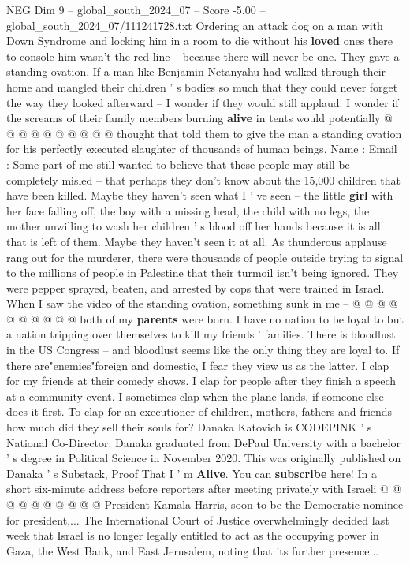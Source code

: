 \begin{textsample}{NEG Dim 9 – global\_south\_2024\_07 – Score -5.00 – global\_south\_2024\_07/111241728.txt}
Ordering an attack dog on a man with Down Syndrome and locking him in a room to die without his \textbf{loved} ones there to console him wasn't the red line -- because there will never be one.
They gave a standing ovation.
If a man like Benjamin Netanyahu had walked through their home and mangled their children ' s bodies so much that they could never forget the way they looked afterward -- I wonder if they would still applaud.
I wonder if the screams of their family members burning \textbf{alive} in tents would potentially @ @ @ @ @ @ @ @ @ @ thought that told them to give the man a standing ovation for his perfectly executed slaughter of thousands of human beings.
Name : Email : Some part of me still wanted to believe that these people may still be completely misled -- that perhaps they don't know about the 15,000 children that have been killed.
Maybe they haven't seen what I ' ve seen -- the little \textbf{girl} with her face falling off, the boy with a missing head, the child with no legs, the mother unwilling to wash her children ' s blood off her hands because it is all that is left of them.
Maybe they haven't seen it at all.
As thunderous applause rang out for the murderer, there were thousands of people outside trying to signal to the millions of people in Palestine that their turmoil isn't being ignored.
They were pepper sprayed, beaten, and arrested by cops that were trained in Israel.
When I saw the video of the standing ovation, something sunk in me -- @ @ @ @ @ @ @ @ @ @ both of my \textbf{parents} were born.
I have no nation to be loyal to but a nation tripping over themselves to kill my friends ' families.
There is bloodlust in the US Congress -- and bloodlust seems like the only thing they are loyal to.
If there are"enemies"foreign and domestic, I fear they view us as the latter.
I clap for my friends at their comedy shows.
I clap for people after they finish a speech at a community event.
I sometimes clap when the plane lands, if someone else does it first.
To clap for an executioner of children, mothers, fathers and friends -- how much did they sell their souls for?
Danaka Katovich is CODEPINK ' s National Co-Director.
Danaka graduated from DePaul University with a bachelor ' s degree in Political Science in November 2020.
This was originally published on Danaka ' s Substack, Proof That I ' m \textbf{Alive}.
You can \textbf{subscribe} here!
In a short six-minute address before reporters after meeting privately with Israeli @ @ @ @ @ @ @ @ @ @ President Kamala Harris, soon-to-be the Democratic nominee for president,...
The International Court of Justice overwhelmingly decided last week that Israel is no longer legally entitled to act as the occupying power in Gaza, the West Bank, and East Jerusalem, noting that its further presence...

\end{textsample}
